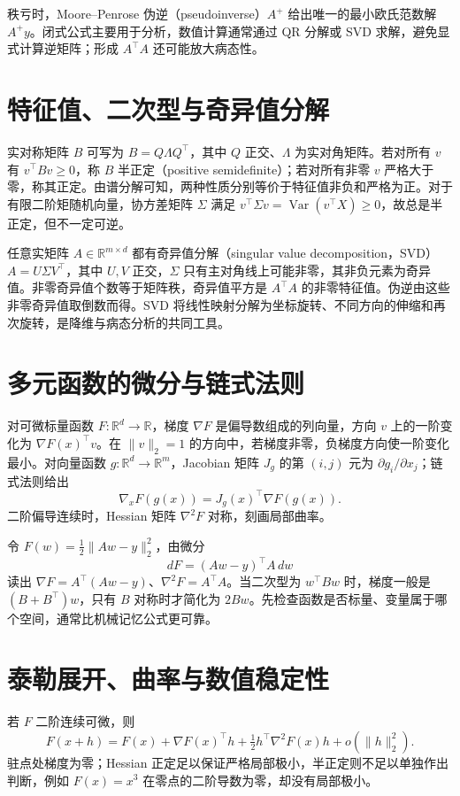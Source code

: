 秩亏时，Moore--Penrose 伪逆（pseudoinverse）$A^+$ 给出唯一的最小欧氏范数解 $A^+y$。闭式公式主要用于分析，数值计算通常通过 QR 分解或 SVD 求解，避免显式计算逆矩阵；形成 $A^\top A$ 还可能放大病态性。

\section{特征值、二次型与奇异值分解}

实对称矩阵 $B$ 可写为 $B=Q\Lambda Q^\top$，其中 $Q$ 正交、$\Lambda$ 为实对角矩阵。若对所有 $v$ 有 $v^\top Bv\geq0$，称 $B$ 半正定（positive semidefinite）；若对所有非零 $v$ 严格大于零，称其正定。由谱分解可知，两种性质分别等价于特征值非负和严格为正。对于有限二阶矩随机向量，协方差矩阵 $\Sigma$ 满足 $v^\top\Sigma v=\operatorname{Var}(v^\top X)\geq0$，故总是半正定，但不一定可逆。

任意实矩阵 $A\in\mathbb R^{m\times d}$ 都有奇异值分解（singular value decomposition，SVD）$A=U\Sigma V^\top$，其中 $U,V$ 正交，$\Sigma$ 只有主对角线上可能非零，其非负元素为奇异值。非零奇异值个数等于矩阵秩，奇异值平方是 $A^\top A$ 的非零特征值。伪逆由这些非零奇异值取倒数而得。SVD 将线性映射分解为坐标旋转、不同方向的伸缩和再次旋转，是降维与病态分析的共同工具。

\section{多元函数的微分与链式法则}

对可微标量函数 $F:\mathbb R^d\to\mathbb R$，梯度 $\nabla F$ 是偏导数组成的列向量，方向 $v$ 上的一阶变化为 $\nabla F(x)^\top v$。在 $\|v\|_2=1$ 的方向中，若梯度非零，负梯度方向使一阶变化最小。对向量函数 $g:\mathbb R^d\to\mathbb R^m$，Jacobian 矩阵 $J_g$ 的第 $(i,j)$ 元为 $\partial g_i/\partial x_j$；链式法则给出
\[
 \nabla_x F(g(x))=J_g(x)^\top\nabla F(g(x)).
\]
二阶偏导连续时，Hessian 矩阵 $\nabla^2F$ 对称，刻画局部曲率。

令 $F(w)=\tfrac12\|Aw-y\|_2^2$，由微分
\[
 dF=(Aw-y)^\top A\,dw
\]
读出 $\nabla F=A^\top(Aw-y)$、$\nabla^2F=A^\top A$。当二次型为 $w^\top Bw$ 时，梯度一般是 $(B+B^\top)w$，只有 $B$ 对称时才简化为 $2Bw$。先检查函数是否标量、变量属于哪个空间，通常比机械记忆公式更可靠。

\section{泰勒展开、曲率与数值稳定性}

若 $F$ 二阶连续可微，则
\[
 F(x+h)=F(x)+\nabla F(x)^\top h+\tfrac12h^\top\nabla^2F(x)h+o(\|h\|_2^2).
\]
驻点处梯度为零；Hessian 正定足以保证严格局部极小，半正定则不足以单独作出判断，例如 $F(x)=x^3$ 在零点的二阶导数为零，却没有局部极小。

